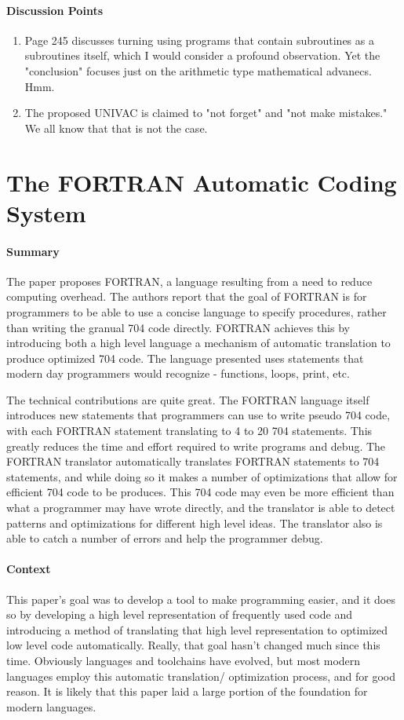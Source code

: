 \paragraph{\textbf{Discussion Points}}
\begin{enumerate}
    \item Page 245 discusses turning using programs that contain subroutines as
    a subroutines itself, which I would consider a profound observation. Yet the
    "conclusion" focuses just on the arithmetic type mathematical advanecs. Hmm.
    \item The proposed UNIVAC is claimed to "not forget" and "not make
    mistakes." We all know that that is not the case.
\end{enumerate}


\section {The FORTRAN Automatic Coding System \cite{backus1957fortran}}


\paragraph{\textbf{Summary}}
The paper proposes FORTRAN, a language resulting from a need to reduce computing
overhead. The authors report that the goal of FORTRAN is for programmers to be
able to use a concise language to specify procedures, rather than writing the
granual 704 code directly. FORTRAN achieves this by introducing both a high
level language a mechanism of automatic translation to produce optimized 704
code. The language presented uses statements that modern day programmers would
recognize - functions, loops, print, etc.

The technical contributions are quite great. The FORTRAN language itself
introduces new statements that programmers can use to write pseudo 704 code,
with each FORTRAN statement translating to 4 to 20 704 statements. This greatly
reduces the time and effort required to write programs and debug. The FORTRAN
translator automatically translates FORTRAN statements to 704 statements, and
while doing so it makes a number of optimizations that allow for efficient 704
code to be produces. This 704 code may even be more efficient than what a
programmer may have wrote directly, and the translator is able to detect
patterns and optimizations for different high level ideas. The translator also
is able to catch a number of errors and help the programmer debug.
\paragraph{\textbf{Context}}
This paper's goal was to develop a tool to make programming easier, and it does
so by developing a high level representation of frequently used code and
introducing a method of translating that high level representation to optimized
low level code automatically. Really, that goal hasn't changed much since this
time. Obviously languages and toolchains have evolved, but most modern languages
employ this automatic translation/ optimization process, and for good reason. It
is likely that this paper laid a large portion of the foundation for modern
languages.
